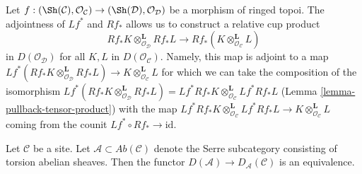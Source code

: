\begin{remark}
\label{remark-cup-product}
Let $f : (\Sh(\mathcal{C}), \mathcal{O}_\mathcal{C}) \to
(\Sh(\mathcal{D}), \mathcal{O}_\mathcal{D})$ be a morphism of
ringed topoi. The adjointness of $Lf^*$ and $Rf_*$ allows us to construct
a relative cup product
$$
Rf_*K \otimes_{\mathcal{O}_\mathcal{D}}^\mathbf{L} Rf_*L
\longrightarrow
Rf_*(K \otimes_{\mathcal{O}_\mathcal{C}}^\mathbf{L} L)
$$
in $D(\mathcal{O}_\mathcal{D})$ for all $K, L$ in $D(\mathcal{O}_\mathcal{C})$.
Namely, this map is adjoint to a map
$Lf^*(Rf_*K \otimes_{\mathcal{O}_\mathcal{D}}^\mathbf{L} Rf_*L) \to
K \otimes_{\mathcal{O}_\mathcal{C}}^\mathbf{L} L$ for which we can take the
composition of the isomorphism
$Lf^*(Rf_*K \otimes_{\mathcal{O}_\mathcal{D}}^\mathbf{L} Rf_*L) =
Lf^*Rf_*K \otimes_{\mathcal{O}_\mathcal{C}}^\mathbf{L} Lf^*Rf_*L$
(Lemma \ref{lemma-pullback-tensor-product})
with the map
$Lf^*Rf_*K \otimes_{\mathcal{O}_\mathcal{C}}^\mathbf{L} Lf^*Rf_*L
\to K \otimes_{\mathcal{O}_\mathcal{C}}^\mathbf{L} L$
coming from the counit $Lf^* \circ Rf_* \to \text{id}$.
\end{remark}

\begin{lemma}
\label{lemma-torsion}
Let $\mathcal{C}$ be a site. Let $\mathcal{A} \subset \textit{Ab}(\mathcal{C})$
denote the Serre subcategory consisting of torsion abelian sheaves.
Then the functor $D(\mathcal{A}) \to D_\mathcal{A}(\mathcal{C})$
is an equivalence.
\end{lemma}


